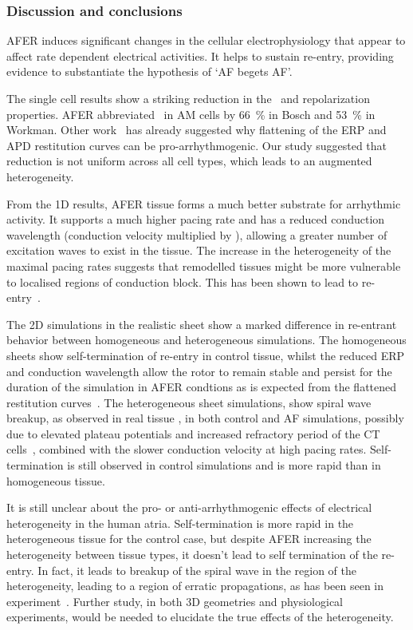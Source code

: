 \subsubsection{Discussion and conclusions}

AFER induces significant changes in the cellular electrophysiology that
appear to affect rate dependent electrical activities.  It helps to
sustain re-entry, providing evidence to substantiate the hypothesis of
`AF begets AF'.

The single cell results show a striking reduction in the \apd\ and
repolarization properties.
AFER abbreviated \apd\ in AM cells by 66~\% in Bosch and 53~\% in Workman.
Other work~\cite{Xie2002,ByungSoo2002,Karma1994,Tusscher2006} has already suggested why flattening of
the ERP and APD restitution curves can be pro-arrhythmogenic.
Our study suggested that reduction is not uniform across all cell types, which
leads to an augmented heterogeneity.

From the 1D results, AFER tissue forms a much better substrate for arrhythmic
activity.
It supports a much higher pacing rate and has a reduced conduction wavelength
(conduction velocity multiplied by \apd), allowing a greater number of
excitation waves to exist in the tissue.
The increase in the heterogeneity of the maximal pacing rates suggests that
remodelled tissues might be more vulnerable to localised regions of conduction
block.
This has been shown to lead to re-entry~\cite{Xie2001a}.

The 2D simulations in the realistic sheet show a marked difference in
re-entrant behavior between homogeneous and heterogeneous simulations.
The homogeneous sheets show self-termination of re-entry in control
tissue, whilst the reduced ERP and conduction wavelength allow the rotor
to remain stable and persist for the duration of the simulation in AFER
condtions as is expected from the flattened restitution
curves~\cite{Xie2002,Karma1994}.
The heterogeneous sheet simulations, show spiral wave
breakup, as observed in real tissue \cite{Kumagai1997}, in both control
and AF simulations, possibly due to elevated plateau potentials and
increased refractory period of the CT cells~\cite{Clayton2005}, combined with
the slower conduction velocity at high pacing rates.
Self-termination is still observed in control simulations and is more rapid than
in homogeneous tissue.

It is still unclear about the pro- or anti-arrhythmogenic effects of
electrical heterogeneity in the human atria.  Self-termination is more
rapid in the heterogeneous tissue for the control case, but despite AFER
increasing the heterogeneity between tissue types, it doesn't lead to
self termination of the re-entry.  In fact, it leads to breakup of the
spiral wave in the region of the heterogeneity, leading to a region of
erratic propagations, as has been seen in experiment~\cite{Kumagai1997}.
Further study, in both 3D geometries and physiological experiments,
would be needed to elucidate the true effects of the heterogeneity.

